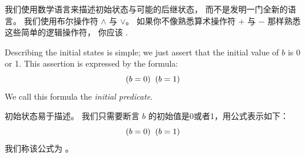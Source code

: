 \begin{ch}
  我们使用数学语言来描述初始状态与可能的后继状态，
  而不是发明一门全新的语言。
  我们使用布尔操作符 $\land$ 与 $\lor$。
  如果你不像熟悉算术操作符 $+$ 与 $-$ 那样熟悉这些简单的逻辑操作符，
  你应该%
  \textsf{}.
\end{ch}

\begin{en}
Describing the initial states is simple; we just assert that the 
initial value of $b$ is 0 or 1.  This assertion is expressed by
the formula:
 \[ (b=0) \; \/ \; (b=1)\]
We call this formula the 
\emph{initial predicate}.
\end{en}

\begin{ch}
  初始状态易于描述。
  我们只需要断言 $b$ 的初始值是0或者1，用公式表示如下：
  \[ (b=0) \; \/ \; (b=1)\]
  我们称该公式为%
  \emph{\tlainitpredicate}。
\end{ch}

